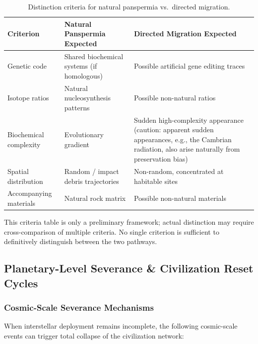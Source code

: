 \documentclass[aps,prd,twocolumn,superscriptaddress,nofootinbib]{revtex4-2}
\begin{document}
\begin{table}[htbp]
\caption{Distinction criteria for natural panspermia vs.\ directed migration.}
\label{tab:distinction-criteria}
\footnotesize
\begin{tabular}{P{0.218\textwidth}P{0.291\textwidth}P{0.388\textwidth}}
\toprule
Criterion & Natural Panspermia Expected & Directed Migration Expected \\
\midrule
Genetic code & Shared biochemical systems (if homologous) & Possible artificial gene editing traces \\
Isotope ratios & Natural nucleosynthesis patterns & Possible non-natural ratios \\
Biochemical complexity & Evolutionary gradient & Sudden high-complexity appearance (caution: apparent sudden appearances, e.g., the Cambrian radiation, also arise naturally from preservation bias) \\
Spatial distribution & Random / impact debris trajectories & Non-random, concentrated at habitable sites \\
Accompanying materials & Natural rock matrix & Possible non-natural materials \\
\bottomrule
\end{tabular}
\end{table}

This criteria table is only a preliminary framework; actual distinction may require cross-comparison of multiple criteria. No single criterion is sufficient to definitively distinguish between the two pathways.

\subsection{Planetary-Level Severance \& Civilization Reset Cycles}\label{sec:severance}

\subsubsection{Cosmic-Scale Severance Mechanisms}\label{sec:severance-mechanisms}

When interstellar deployment remains incomplete, the following cosmic-scale events can trigger total collapse of the civilization network:
\end{document}
